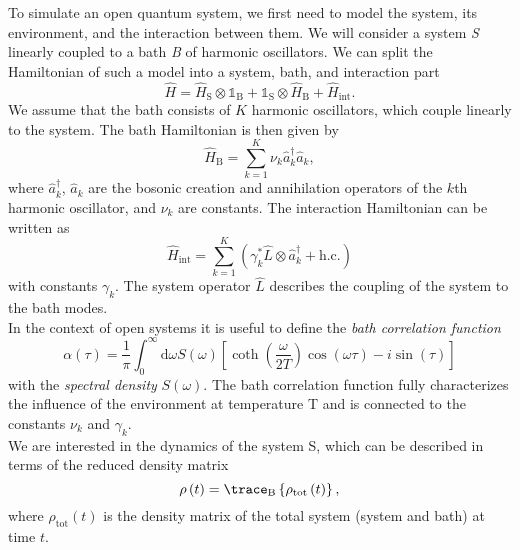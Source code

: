 To simulate an open quantum system, we first need to model the system, its environment, and the interaction between them.
We will consider a system \textit{S} linearly coupled to a bath \textit{B} of harmonic oscillators. 
We can split the Hamiltonian of such a model into a system, bath, and interaction part
\begin{equation*}
    \hat{H} = \hat{H}_\text{S} \otimes \mathbb{1}_\text{B} + \mathbb{1}_\text{S} \otimes \hat{H}_\text{B}
    + \hat{H}_\text{int}.
\end{equation*}
We assume that the bath consists of $K$ harmonic oscillators, which couple linearly to the system. 
The bath Hamiltonian is then given by
\begin{equation*}
    \hat{H}_\text{B} = \sum_{k=1}^{K}\nu_{k} 
    \hat{a}^\dagger_{k} \hat{a}_{k},
\end{equation*}
where $\hat{a}^\dagger_{k}$, $\hat{a}_{k}$ are the bosonic creation and annihilation
operators of the $k$th harmonic oscillator, and $\nu_{k}$ are constants.
The interaction Hamiltonian can be written as
\begin{equation*}
    \hat{H}_\text{int} = \sum_{k=1}^{K} \left( \gamma_{k}^*
    \hat{L} \otimes \hat{a}_{k}^\dagger + \text{h.c.} \right)
\end{equation*}
with constants $\gamma_{k}$. The system operator $\hat{L}$ describes the coupling
of the system to the bath modes.
\\
In the context of open systems it is useful to 
define the \textit{bath correlation function}
\begin{equation}
    \label{eq:bath_correlation_function}
    \alpha(\tau) = \frac{1}{\pi} \int_0^\infty \text{d}\omega S(\omega) 
    \left[\coth\left(\frac{\omega}{2T}\right)\cos\left(\omega\tau\right)-i\sin\left(\tau\right)\right]
\end{equation}
with the \textit{spectral density} $S\left(\omega\right)$. The bath correlation function fully
characterizes the influence of the environment at temperature T \cite{Gao:2022} and is connected
to the constants $\nu_{k}$ and $\gamma_{k}$.
\\
We are interested in the dynamics of the system S, which can be described in terms of the reduced
density matrix
\begin{equation*}
    \rho\left(t\right) = \trace_\text{B}\left\{\rho_\text{tot}\left(t\right)\right\},
\end{equation*}
where $\rho_\text{tot}\left(t\right)$ is the density matrix of the total system (system and bath) at time $t$.
